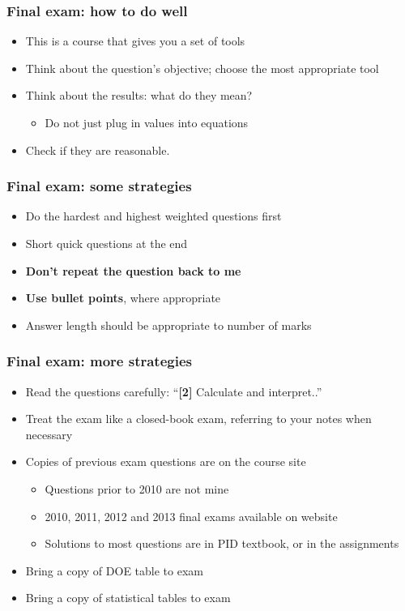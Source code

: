 \begin{frame}\frametitle{Final exam: how to do well}
	\begin{itemize}
		\item	This is a course that gives you a set of tools 
		\item	Think about the question's objective; choose the most appropriate tool 
		\item	Think about the results: what do they mean?  
		\begin{itemize}
			\item	Do not just plug in values into equations 
		\end{itemize}
		\item	Check if they are reasonable. 
	\end{itemize}
\end{frame}

\begin{frame}\frametitle{Final exam: some strategies}
	\begin{itemize}
		\item	Do the hardest and highest weighted questions first 
		\item	Short quick questions at the end 
		\item	\textbf{Don't repeat the question back to me} 
		\item	\textbf{Use bullet points}, where appropriate 
		\item	Answer length should be appropriate to number of marks 
	\end{itemize}
\end{frame}

\begin{frame}\frametitle{Final exam: more strategies}
	\begin{itemize}
		\item	Read the questions carefully: ``\textbf{[2]} Calculate and interpret..''
		\item	Treat the exam like a closed-book exam, referring to your notes when necessary 

		\item	Copies of previous exam questions are on the course site 
		\begin{itemize}
			\item	Questions prior to 2010 are not mine 
			\item	2010, 2011, 2012 and 2013 final exams available on website 
			\item	Solutions to most questions are in PID textbook, or in the assignments
		\end{itemize}
	\end{itemize}
	\begin{itemize}
		\item	Bring a copy of DOE table to exam 
		\item	Bring a copy of statistical tables to exam 
	\end{itemize}
\end{frame}

